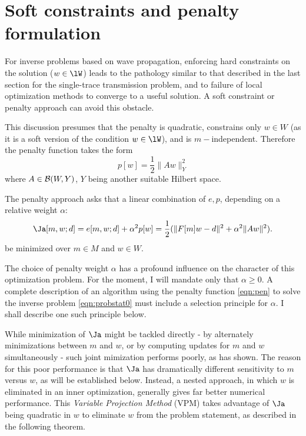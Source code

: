 \section{Soft constraints and penalty formulation}

For inverse problems based on wave propagation, enforcing hard
constraints on the solution ($w \in \lW$) leads to the pathology
similar to that described in the last
section for the single-trace transmission problem, and to failure of
local optimization methods to converge to a useful solution. A soft
constraint or penalty approach can avoid this obstacle.

This
discussion presumes that the penalty is quadratic, constrains only
$w\in W$
(as it is a soft version of the condition $w \in \lW$), and is
$m-$independent. Therefore the penalty function takes the form
\begin{equation}
\label{eqn:pen}
p[w] = \frac{1}{2}\|Aw\|_Y^2 
\end{equation}
where $A \in {\cal B}(W,Y)$, $Y$ being another suitable Hilbert
space.

The penalty approach asks that a linear combination of $e,p$,
depending on a relative weight $\alpha$:
\begin{equation}
\Ja[m, w;d] = e[m,w;d] + \alpha^2 p[w] = \frac{1}{2}(\|F[m]w-d\|^2 + \alpha^2 \|Aw\|^2).
\label{eqn:pen}
\end{equation}
be minimized over $m\in M$ and $w\in W$.

The choice of penalty weight $\alpha$ has a profound influence on the
character of this optimization problem. For the moment, I will mandate
only that $\alpha \ge 0$. A complete description of an algorithm using
the penalty function \ref{eqn:pen} to solve the inverse problem
\ref{eqn:probstat0} must include a selection principle for $\alpha$. I
shall describe one such principle below.  

While minimization of $\Ja$ might be tackled directly - by
alternately minimizations between $m$ and $w$, or by computing updates
for $m$ and $w$ simultaneously - such joint mimization performs
poorly, as \cite{YinHuang:16} has shown. The reason for this poor
performance is that $\Ja$ has dramatically different
sensitivity to $m$ versus $w$,
as will be established below.
Instead, a nested approach, in which $w$ is
eliminated in an inner optimization,
generally gives far better numerical performance.  This {\em Variable
Projection Method} (VPM) \cite[]{GolubPereyra:03} takes advantage of
$\Ja$ being quadratic in
$w$ to eliminate $w$ from the problem statement, as described in the
following theorem.

